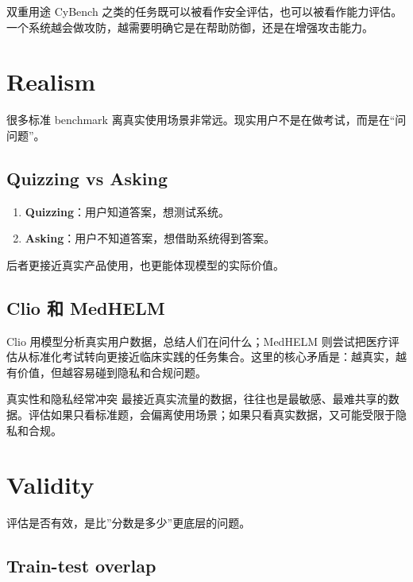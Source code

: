 \documentclass[a4paper]{article}
\begin{document}
\begin{warningbox}{双重用途}
CyBench 之类的任务既可以被看作安全评估，也可以被看作能力评估。一个系统越会做攻防，越需要明确它是在帮助防御，还是在增强攻击能力。
\end{warningbox}

\section{Realism}

很多标准 benchmark 离真实使用场景非常远。现实用户不是在做考试，而是在“问问题”。

\subsection{Quizzing vs Asking}

\begin{enumerate}
    \item \textbf{Quizzing}：用户知道答案，想测试系统。
    \item \textbf{Asking}：用户不知道答案，想借助系统得到答案。
\end{enumerate}

后者更接近真实产品使用，也更能体现模型的实际价值。

\subsection{Clio 和 MedHELM}

Clio 用模型分析真实用户数据，总结人们在问什么；MedHELM 则尝试把医疗评估从标准化考试转向更接近临床实践的任务集合。这里的核心矛盾是：越真实，越有价值，但越容易碰到隐私和合规问题。

\begin{importantbox}{真实性和隐私经常冲突}
最接近真实流量的数据，往往也是最敏感、最难共享的数据。评估如果只看标准题，会偏离使用场景；如果只看真实数据，又可能受限于隐私和合规。
\end{importantbox}

\section{Validity}

评估是否有效，是比”分数是多少”更底层的问题。

\subsection{Train-test overlap}
\end{document}

